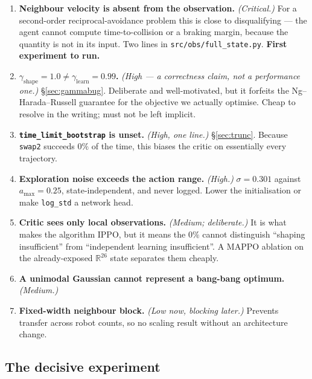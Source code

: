 \documentclass[11pt,a4paper]{article}
\newcommand{\code}[1]{\texttt{\small #1}}
\newcommand{\R}{\mathbb{R}}
\begin{document}
\begin{enumerate}[leftmargin=1.8em,itemsep=6pt]

\item \textbf{Neighbour velocity is absent from the observation.} \emph{(Critical.)} For a
second-order reciprocal-avoidance problem this is close to disqualifying --- the agent cannot
compute time-to-collision or a braking margin, because the quantity is not in its input. Two
lines in \code{src/obs/full\_state.py}. \textbf{First experiment to run.}

\item \textbf{$\gamma_{\text{shape}} = 1.0 \ne \gamma_{\text{learn}} = 0.99$.}
\emph{(High --- a correctness claim, not a performance one.)} \S\ref{sec:gammabug}.
Deliberate and well-motivated, but it forfeits the Ng--Harada--Russell guarantee for the
objective we actually optimise. Cheap to resolve in the writing; must not be left implicit.

\item \textbf{\code{time\_limit\_bootstrap} is unset.} \emph{(High, one line.)}
\S\ref{sec:trunc}. Because \code{swap2} succeeds $0\%$ of the time, this biases the critic on
essentially every trajectory.

\item \textbf{Exploration noise exceeds the action range.} \emph{(High.)}
$\sigma = 0.301$ against $a_{\max} = 0.25$, state-independent, and never logged. Lower the
initialisation or make \code{log\_std} a network head.

\item \textbf{Critic sees only local observations.} \emph{(Medium; deliberate.)} It is what
makes the algorithm IPPO, but it means the $0\%$ cannot distinguish ``shaping insufficient''
from ``independent learning insufficient''. A MAPPO ablation on the already-exposed $\R^{26}$
state separates them cheaply.

\item \textbf{A unimodal Gaussian cannot represent a bang-bang optimum.} \emph{(Medium.)}

\item \textbf{Fixed-width neighbour block.} \emph{(Low now, blocking later.)} Prevents
transfer across robot counts, so no scaling result without an architecture change.
\end{enumerate}

\subsection{The decisive experiment}
\end{document}
